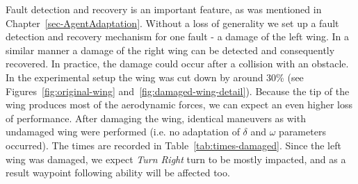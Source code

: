 Fault detection and recovery is an important feature, as was mentioned in Chapter~\ref{sec-AgentAdaptation}. Without a loss of generality we set up a fault detection and recovery mechanism for one fault - a damage of the left wing. In a similar manner a damage of the right wing can be detected and consequently recovered. In practice, the damage could occur after a collision with an obstacle. In the experimental setup the wing was cut down by around 30\% (see Figures~\ref{fig:original-wing} and~\ref{fig:damaged-wing-detail}). Because the tip of the wing produces most of the aerodynamic forces, we can expect an even higher loss of performance. After damaging the wing, identical maneuvers as with undamaged wing were performed (i.e. no adaptation of $\delta$ and $\omega$ parameters occurred). The times are recorded in Table~\ref{tab:times-damaged}. Since the left wing was damaged, we expect \textit{Turn Right} turn to be mostly impacted, and as a result waypoint following ability will be affected too. 


